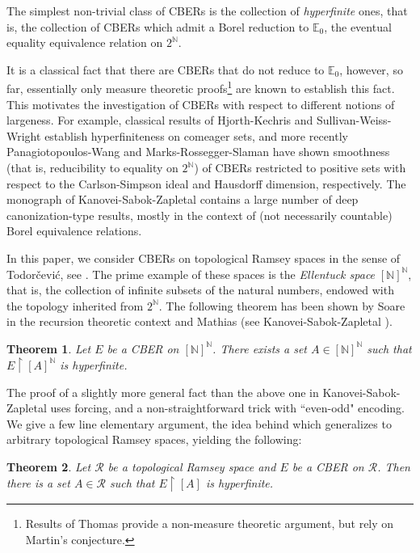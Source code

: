 \documentclass[11pt]{amsart}
\newcommand{\N}{\mathbb{N}}
\renewcommand{\restriction}[2]{#1 \upharpoonright #2}
\newtheorem{theorem}{Theorem}[section]
\theoremstyle{definition}
\numberwithin{equation}{section}
\newcommand{\mc}{\mathcal}
\begin{document}
	The simplest non-trivial class of CBERs is the collection of \emph{hyperfinite} ones, that is, the collection of CBERs which admit a Borel reduction to $\mathbb{E}_0$, the eventual equality equivalence relation on $2^\N$. 
	
	It is a classical fact that there are CBERs that do not reduce to $\mathbb{E}_0$, however, so far, essentially only measure theoretic proofs\footnote{Results of Thomas \cite{thomas2009martin} provide a non-measure theoretic argument, but rely on Martin's conjecture.} are known to establish this fact. This motivates the investigation of CBERs with respect to different notions of largeness. For example, classical results of Hjorth-Kechris \cite{hjorth-kechris1996} and Sullivan-Weiss-Wright \cite{sullivan1986generic} establish hyperfiniteness on comeager sets, and more recently Panagiotopoulos-Wang \cite{panagiotopoulos2022every} and Marks-Rossegger-Slaman \cite{marks2024hausdorff} have shown smoothness (that is, reducibility to equality on $2^\N$) of CBERs restricted to positive sets with respect to the Carlson-Simpson ideal and Hausdorff dimension, respectively. The monograph of Kanovei-Sabok-Zapletal \cite{kanovei2013canonical} contains a large number of deep canonization-type results, mostly in the context of (not necessarily countable) Borel equivalence relations.  
	
	In this paper, we consider CBERs on topological Ramsey spaces in the sense of Todor\v{c}evi\'c, see \cite{ramseyspaces}. The prime example of these spaces is the \emph{Ellentuck space} $[\N]^\N$, that is, the collection of infinite subsets of the natural numbers, endowed with the topology inherited from $2^\N$. The following theorem has been shown by Soare \cite{soare1969sets} in the recursion theoretic context and Mathias (see Kanovei-Sabok-Zapletal \cite{kanovei2013canonical}). 
	
	\begin{theorem}
		\label{t:ellentuck}
		Let $E$ be a CBER on $[\N]^\N$. There exists a set $A \in [\N]^\N$ such that $\restriction{E}{[A]^\N}$ is hyperfinite. 
	\end{theorem}
	
	The proof of a slightly more general fact than the above one in Kanovei-Sabok-Zapletal \cite{kanovei2013canonical} uses forcing, and a non-straightforward trick with ``even-odd" encoding. We give a few line elementary argument, the idea behind which generalizes to arbitrary topological Ramsey spaces, yielding the following: 
	
	\begin{theorem} \label{t:ramsey hyperfin}
		Let $\mathcal{R}$ be a topological Ramsey space and $E$ be a CBER on $\mathcal{R}$. Then there is a set $A \in \mc{R}$ such that $\restriction{E}{[A]}$ is hyperfinite. 
	\end{theorem}
	
\end{document}
